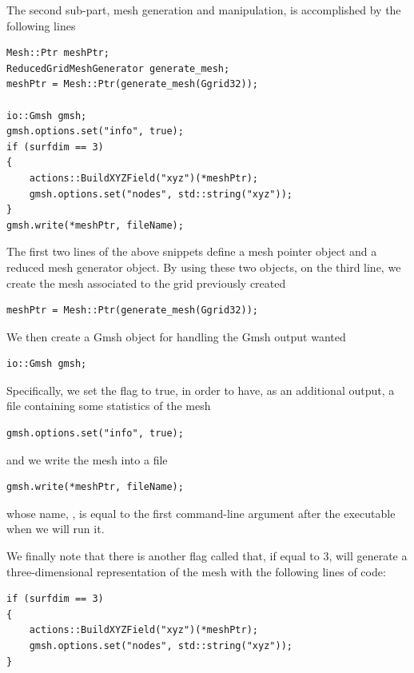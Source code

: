 The second sub-part, mesh generation and manipulation, is accomplished 
by the following lines 
%
\begin{lstlisting}[style=CStyleNoLine]
Mesh::Ptr meshPtr;
ReducedGridMeshGenerator generate_mesh;
meshPtr = Mesh::Ptr(generate_mesh(Ggrid32));
 
io::Gmsh gmsh;
gmsh.options.set("info", true);
if (surfdim == 3)
{
    actions::BuildXYZField("xyz")(*meshPtr);
    gmsh.options.set("nodes", std::string("xyz"));
}
gmsh.write(*meshPtr, fileName);
\end{lstlisting}
%
The first two lines of the above snippets define a mesh pointer object 
and a reduced mesh generator object. By using these two objects, on the 
third line, we create the mesh associated to the grid previously created
%
\begin{lstlisting}[style=CStyleNoLine]
meshPtr = Mesh::Ptr(generate_mesh(Ggrid32));
\end{lstlisting}
%
We then create a Gmsh object for handling the Gmsh output wanted
%
\begin{lstlisting}[style=CStyleNoLine]
io::Gmsh gmsh;
\end{lstlisting}
%
Specifically, we set the flag  to true, in order to 
have, as an additional output, a file containing some statistics 
of the mesh
%
\begin{lstlisting}[style=CStyleNoLine]
gmsh.options.set("info", true);
\end{lstlisting}
%
and we write the mesh into a file
%
\begin{lstlisting}[style=CStyleNoLine]
gmsh.write(*meshPtr, fileName);
\end{lstlisting}
%
whose name, , is equal to the first command-line 
argument after the executable when we will run it.

We finally note that there is another flag called  
that, if equal to 3, will generate a three-dimensional representation 
of the mesh with the following lines of code:
%
\begin{lstlisting}[style=CStyleNoLine]
if (surfdim == 3)
{
    actions::BuildXYZField("xyz")(*meshPtr);
    gmsh.options.set("nodes", std::string("xyz"));
}
\end{lstlisting}
%

